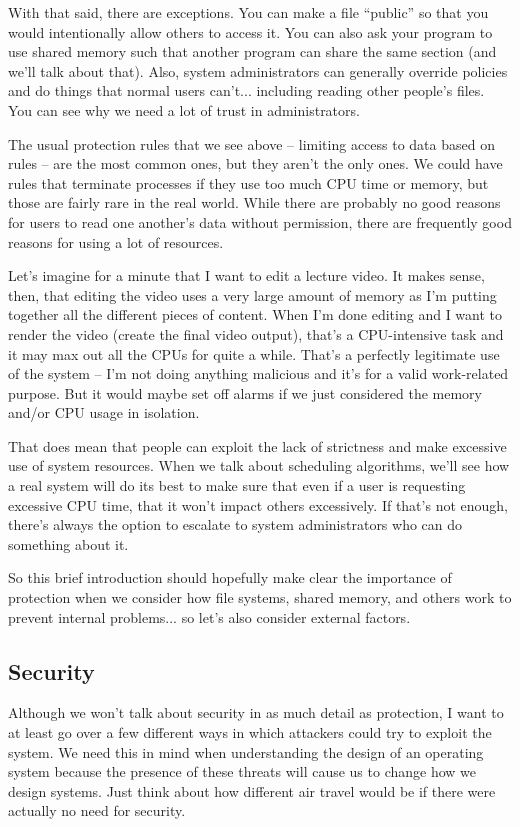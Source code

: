 With that said, there are exceptions. You can make a file ``public'' so that you would intentionally allow others to access it. You can also ask your program to use shared memory such that another program can share the same section (and we'll talk about that). Also, system administrators can generally override policies and do things that normal users can't... including reading other people's files. You can see why we need a lot of trust in administrators.

The usual protection rules that we see above -- limiting access to data based on rules -- are the most common ones, but they aren't the only ones. We could have rules that terminate processes if they use too much CPU time or memory, but those are fairly rare in the real world. While there are probably no good reasons for users to read one another's data without permission, there are frequently good reasons for using a lot of resources. 

Let's imagine for a minute that I want to edit a lecture video. It makes sense, then, that editing the video uses a very large amount of memory as I'm putting together all the different pieces of content. When I'm done editing and I want to render the video (create the final video output), that's a CPU-intensive task and it may max out all the CPUs for quite a while. That's a perfectly legitimate use of the system -- I'm not doing anything malicious and it's for a valid work-related purpose. But it would maybe set off alarms if we just considered the memory and/or CPU usage in isolation.

That does mean that people can exploit the lack of strictness and make excessive use of system resources. When we talk about scheduling algorithms, we'll see how a real system will do its best to make sure that even if a user is requesting excessive CPU time, that it won't impact others excessively. If that's not enough, there's always the option to escalate to system administrators who can do something about it.

So this brief introduction should hopefully make clear the importance of protection when we consider how file systems, shared memory, and others work to prevent internal problems... so let's also consider external factors.

\subsection*{Security}
Although we won't talk about security in as much detail as protection, I want to at least go over a few different ways in which attackers could try to exploit the system. We need this in mind when understanding the design of an operating system because the presence of these threats will cause us to change how we design systems. Just think about how different air travel would be if there were actually no need for security. 

